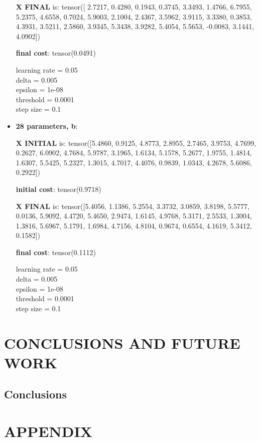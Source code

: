\documentclass[inscr,ack,preface]{diphdthesis}
\begin{document}
\begin{itemize}
\textbf{X FINAL} is:
tensor([ 2.7217,  0.4280,  0.1943,  0.3745,  3.3493,  1.4766,  6.7955,  5.2375,
         4.6558,  0.7024,  5.9003,  2.1004,  2.4367,  3.5962,  3.9115,  3.3380,
         0.3853,  4.3931,  3.5211,  2.5860,  3.9345,  5.3438,  3.9282,  5.4054,
         5.5653, -0.0083,  3.1441,  4.0902])

\textbf{final cost}: tensor(0.0491)

learning rate =  0.05 \\
delta =  0.005 \\
epsilon =  1e-08 \\
threshold =  0.0001\\ 
step size =  0.1 \\

\item \textbf{28 parameters,  b}: 

\textbf{X INITIAL}  is:
 tensor([5.4860, 0.9125, 4.8773, 2.8955, 2.7465, 3.9753, 4.7699, 0.2627, 6.0902,
        4.7684, 5.9787, 3.1965, 1.6134, 5.1578, 5.2677, 1.9755, 1.4814, 1.6307,
        5.5425, 5.2327, 1.3015, 4.7017, 4.4076, 0.9839, 1.0343, 4.2678, 5.6086,
        0.2922])
        
\textbf{initial cost}: tensor(0.9718)

\textbf{X FINAL} is:
 tensor([5.4056, 1.1386, 5.2554, 3.3732, 3.0859, 3.8198, 5.5777, 0.0136, 5.9092,
        4.4720, 5.4650, 2.9474, 1.6145, 4.9768, 5.3171, 2.5533, 1.3004, 1.3816,
        5.6967, 5.1791, 1.6984, 4.7156, 4.8104, 0.9674, 0.6554, 4.1619, 5.3412,
        0.1582])

\textbf{final cost}: tensor(0.1112)

learning rate =  0.05 \\
delta =  0.005 \\
epsilon =  1e-08 \\
threshold =  0.0001\\ 
step size =  0.1 \\

\end{itemize}

\chapter{CONCLUSIONS AND FUTURE WORK}

\section{Conclusions}


\chapter{APPENDIX}
\end{document}
